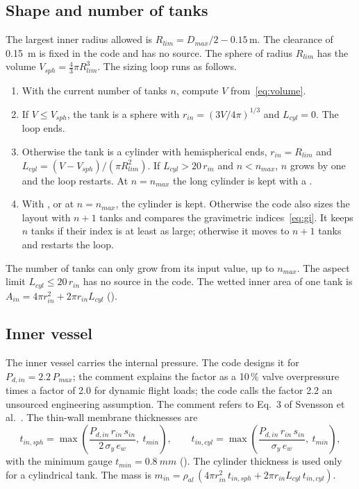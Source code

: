 \documentclass[a4paper,11pt]{article}
\begin{document}
\subsection{Shape and number of tanks}\label{sec:shape}
The largest inner radius allowed is $R_{lim} = D_{max}/2 - 0.15$\,m. The clearance of
\SI{0.15}{m} is fixed in the code and has no source. The sphere of radius $R_{lim}$ has the volume
$V_{sph} = \tfrac43\pi R_{lim}^3$. The sizing loop runs as follows.
\begin{enumerate}
\item With the current number of tanks $n$, compute $V$ from~\eqref{eq:volume}.
\item If $V \le V_{sph}$, the tank is a sphere with $r_{in} = (3V/4\pi)^{1/3}$ and
  $L_{cyl} = 0$. The loop ends.
\item Otherwise the tank is a cylinder with hemispherical ends, $r_{in} = R_{lim}$ and
  $L_{cyl} = (V - V_{sph})/(\pi R_{lim}^2)$. If $L_{cyl} > 20\,r_{in}$ and $n < n_{max}$, $n$
  grows by one and the loop restarts. At $n = n_{max}$ the long cylinder is kept with a
  .
\item With , or at $n = n_{max}$, the cylinder is kept. Otherwise
  the code also sizes the layout with $n+1$ tanks and compares the gravimetric
  indices~\eqref{eq:gi}. It keeps $n$ tanks if their index is at least as large; otherwise it
  moves to $n+1$ tanks and restarts the loop.
\end{enumerate}
The number of tanks can only grow from its input value, up to $n_{max}$. The aspect
limit $L_{cyl} \le 20\,r_{in}$ has no source in the code. The wetted inner area of one tank is
$A_{in} = 4\pi r_{in}^2 + 2\pi r_{in} L_{cyl}$ ().

\subsection{Inner vessel}\label{sec:inner}
The inner vessel carries the internal pressure. The code designs it for $P_{d,in} =
2.2\,P_{max}$; the comment explains the factor as a 10\,\% valve overpressure times a factor of
2.0 for dynamic flight loads; the code calls the factor 2.2 an unsourced engineering
assumption. The comment refers to Eq.~3 of Svensson et
al.~\cite{svensson}. The thin-wall membrane thicknesses are
\begin{equation}
  t_{in,sph} = \max\!\left(\frac{P_{d,in}\, r_{in}\, s_{in}}{2\,\sigma_y\, e_w},\ t_{min}\right),
  \qquad
  t_{in,cyl} = \max\!\left(\frac{P_{d,in}\, r_{in}\, s_{in}}{\sigma_y\, e_w},\ t_{min}\right),
  \label{eq:tinner}
\end{equation}
with the minimum gauge $t_{min} = \SI{0.8}{mm}$ (). The cylinder
thickness is used only for a cylindrical tank. The mass is
$m_{in} = \rho_{al}\,(4\pi r_{in}^2\, t_{in,sph} + 2\pi r_{in} L_{cyl}\, t_{in,cyl})$.
\end{document}
